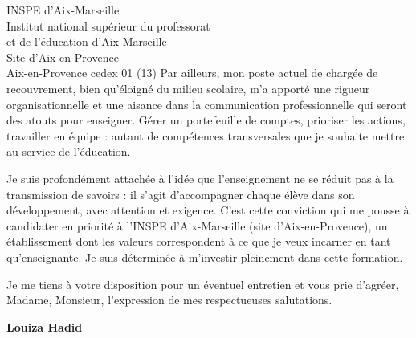 \documentclass[12pt,a4paper]{letter}
\begin{document}
\begin{letter}{INSPE d'Aix-Marseille\\
Institut national supérieur du professorat\\
et de l'éducation d'Aix-Marseille\\
Site d'Aix-en-Provence\\
Aix-en-Provence cedex 01 (13)}
\hspace{1cm} Par ailleurs, mon poste actuel de chargée de recouvrement, bien qu'éloigné du milieu scolaire, m'a apporté une rigueur organisationnelle et une aisance dans la communication professionnelle qui seront des atouts pour enseigner. Gérer un portefeuille de comptes, prioriser les actions, travailler en équipe : autant de compétences transversales que je souhaite mettre au service de l'éducation.

\hspace{1cm} Je suis profondément attachée à l'idée que l'enseignement ne se réduit pas à la transmission de savoirs : il s'agit d'accompagner chaque élève dans son développement, avec attention et exigence. C'est cette conviction qui me pousse à candidater en priorité à l'INSPE d'Aix-Marseille (site d'Aix-en-Provence), un établissement dont les valeurs correspondent à ce que je veux incarner en tant qu'enseignante. Je suis déterminée à m'investir pleinement dans cette formation.

\closing{Je me tiens à votre disposition pour un éventuel entretien et vous prie d'agréer, Madame, Monsieur, l'expression de mes respectueuses salutations.}

\vspace{0.5cm}
\hfill \textbf{Louiza Hadid}

\end{letter}
\end{document}
